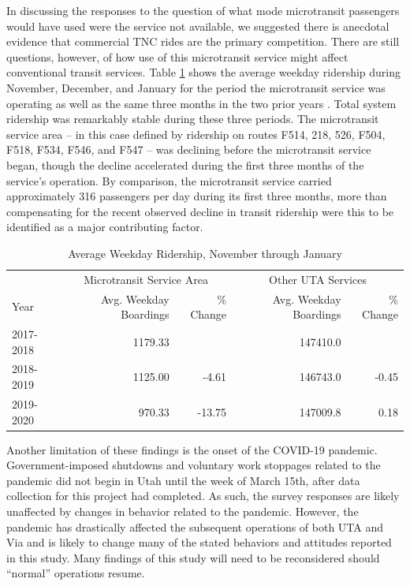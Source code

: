 \documentclass[smartcities,article,submit,moreauthors,pdftex]{mdpi}
\begin{document}
In discussing the responses to the question of what mode microtransit passengers
would have used were the service not available, we suggested there is anecdotal
evidence that commercial TNC rides are the primary competition. There are still
questions, however, of how use of this microtransit service might affect conventional transit
services. Table \ref{tab:uta-ridership} shows the average weekday ridership
during November, December, and January for the period the microtransit service
was operating as well as the same three months in the two prior years
\citep{uta2020boardings}. Total system ridership was remarkably stable during
these three periods. The microtransit service area -- in this case defined by
ridership on routes F514, 218, 526, F504, F518, F534, F546, and F547 -- was
declining before the microtransit service began, though the decline accelerated
during the first three months of the service's operation. By comparison, the
microtransit service carried approximately 316 passengers per day during its
first three months, more than compensating for the recent observed decline in
transit ridership were this to be identified as a major contributing factor.

\begin{table}

\caption{\label{tab:uta-ridership}Average Weekday Ridership, November through January}
\centering
\begin{tabular}[t]{lrrrr}
\toprule
\multicolumn{1}{c}{ } & \multicolumn{2}{c}{Microtransit Service Area} & \multicolumn{2}{c}{Other UTA Services} \\
\cmidrule(l{3pt}r{3pt}){2-3} \cmidrule(l{3pt}r{3pt}){4-5}
Year & Avg. Weekday Boardings & \% Change & Avg. Weekday Boardings & \% Change\\
\midrule
2017-2018 & 1179.33 &  & 147410.0 & \\
2018-2019 & 1125.00 & -4.61 & 146743.0 & -0.45\\
2019-2020 & 970.33 & -13.75 & 147009.8 & 0.18\\
\bottomrule
\end{tabular}
\end{table}

Another limitation of these findings is the onset
of the COVID-19 pandemic. Government-imposed shutdowns and voluntary work
stoppages related to the pandemic did not begin in Utah until the week of March
15th, after data collection for this project had completed. As such, the survey
responses are likely unaffected by changes in behavior related to the pandemic.
However, the pandemic has drastically affected the subsequent operations of both
UTA and Via and is likely to change many of the stated behaviors and attitudes
reported in this study. Many findings of this study will need to be reconsidered
should ``normal'' operations resume.
\end{document}
